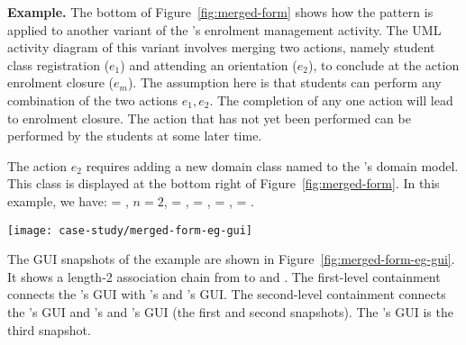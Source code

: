 \noindent\textbf{Example.}
The bottom of Figure~\ref{fig:merged-form} shows how the pattern is applied to another variant of the \courseman's enrolment management activity. The UML activity diagram of this variant involves merging two actions, namely student class registration ($e_1$) and attending an orientation ($e_2$), to conclude at the action enrolment closure ($e_m$). The assumption here is that students can perform any combination of the two actions $e_1, e_2$. The completion of any one action will lead to enrolment closure. The action that has not yet been performed can be performed by the students at some later time.

The action $e_2$ requires adding a new domain class named  to the 's domain model. This class is displayed at the bottom right of Figure~\ref{fig:merged-form}. In this example, we have:  = , $ n = 2 $,  = ,  = ,  = ,  = . 
%
\begin{figure*}[!ht]
	\begin{center}
		\texttt{[image: case-study/merged-form-eg-gui]}
	\end{center}
	\vspace{-0.4cm}
	\caption{The merged pattern form view of enrolment management activity.} %
	\label{fig:merged-form-eg-gui}
	\vspace{-0.4cm}
\end{figure*}

The GUI snapshots of the example are shown in Figure~\ref{fig:merged-form-eg-gui}. It shows a length-2 association chain from  to  and . 
The first-level containment connects the 's GUI with 's and 's GUI. The second-level containment connects the 's GUI and 's and 's GUI (the first and second snapshots). The 's GUI is the third snapshot.

